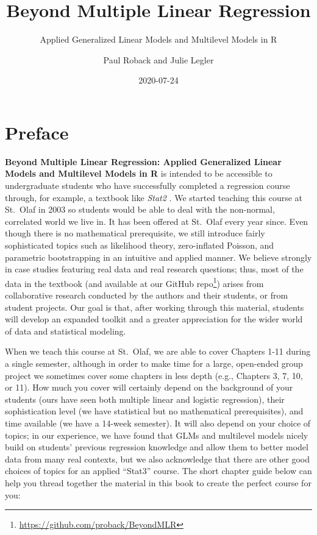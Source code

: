 \documentclass[
]{krantz}
\title{Beyond Multiple Linear Regression}
\subtitle{Applied Generalized Linear Models and Multilevel Models in R}
\author{Paul Roback and Julie Legler}
\date{2020-07-24}
\renewcommand{\href}[2]{#2\footnote{\url{#1}}}
\begin{document}
\maketitle


\thispagestyle{empty}

\setlength{\abovedisplayskip}{-5pt}
\setlength{\abovedisplayshortskip}{-5pt}

{
\hypersetup{linkcolor=}
\setcounter{tocdepth}{2}
\tableofcontents
}
\mainmatter

\hypertarget{preface}{%
\chapter*{Preface}\label{preface}}


\textbf{Beyond Multiple Linear Regression: Applied Generalized Linear Models and Multilevel Models in R} \citep{RProject} is intended to be accessible to undergraduate students who have successfully completed a regression course through, for example, a textbook like \emph{Stat2} \citep{Cannon2019}. We started teaching this course at St.~Olaf in 2003 so students would be able to deal with the non-normal, correlated world we live in. It has been offered at St.~Olaf every year since. Even though there is no mathematical prerequisite, we still introduce fairly sophisticated topics such as likelihood theory, zero-inflated Poisson, and parametric bootstrapping in an intuitive and applied manner. We believe strongly in case studies featuring real data and real research questions; thus, most of the data in the textbook (and \href{https://github.com/proback/BeyondMLR}{available at our GitHub repo}) arises from collaborative research conducted by the authors and their students, or from student projects. Our goal is that, after working through this material, students will develop an expanded toolkit and a greater appreciation for the wider world of data and statistical modeling.

When we teach this course at St.~Olaf, we are able to cover Chapters 1-11 during a single semester, although in order to make time for a large, open-ended group project we sometimes cover some chapters in less depth (e.g., Chapters 3, 7, 10, or 11). How much you cover will certainly depend on the background of your students (ours have seen both multiple linear and logistic regression), their sophistication level (we have statistical but no mathematical prerequisites), and time available (we have a 14-week semester). It will also depend on your choice of topics; in our experience, we have found that GLMs and multilevel models nicely build on students' previous regression knowledge and allow them to better model data from many real contexts, but we also acknowledge that there are other good choices of topics for an applied ``Stat3'' course. The short chapter guide below can help you thread together the material in this book to create the perfect course for you:
\end{document}
